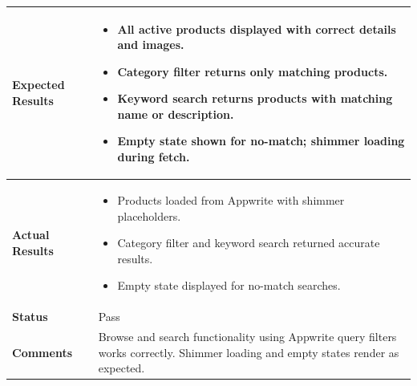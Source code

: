 \begin{table}[H]
\begin{tabular}{|p{3.2cm}|p{10.8cm}|}
\textbf{Expected Results} &
\begin{itemize}[leftmargin=*,noitemsep]
\item All active products displayed with correct details and images.
\item Category filter returns only matching products.
\item Keyword search returns products with matching name or description.
\item Empty state shown for no-match; shimmer loading during fetch.
\end{itemize} \\ \hline
\textbf{Actual Results} &
\begin{itemize}[leftmargin=*,noitemsep]
\item Products loaded from Appwrite with shimmer placeholders.
\item Category filter and keyword search returned accurate results.
\item Empty state displayed for no-match searches.
\end{itemize} \\ \hline
\textbf{Status} & Pass \\ \hline
\textbf{Comments} & Browse and search functionality using Appwrite query filters works correctly. Shimmer loading and empty states render as expected. \\ \hline
\end{tabular}
\end{table}

